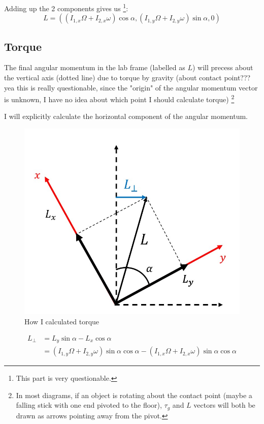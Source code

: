 \documentclass{scrartcl}
\begin{document}
Adding up the 2 components gives us \footnote{This part is very questionable.}:
\begin{equation}
    L=((I_{1,x}\Omega +I_{2,x}\omega)\cos\alpha,(I_{1,y}\Omega +I_{2,y}\omega)\sin\alpha,0)
\end{equation}

\subsection{Torque}
The final angular momentum in the lab frame (labelled as $L$) will precess about the vertical axis (dotted line) due to torque by gravity (about contact point??? yea this is really questionable, since the "origin" of the angular momentum vector is unknown, I have no idea about which point I should calculate torque) \footnote{In most diagrams, if an object is rotating about the contact point (maybe a falling stick with one end pivoted to the floor), $\tau_g$ and $L$ vectors will both be drawn as arrows pointing away from the pivot.}

I will explicitly calculate the horizontal component of the angular momentum.

\begin{figure}[h]
    \centering
    \includegraphics[scale=0.5]{diagram3.jpg}
    \caption{How I calculated torque}
    \label{3}
\end{figure}

\begin{equation}
    \begin{aligned}
        L_\perp & = L_y \sin\alpha- L_x \cos\alpha                                                                        \\
                & = (I_{1,y}\Omega +I_{2,y}\omega)\sin\alpha\cos\alpha-(I_{1,x}\Omega +I_{2,x}\omega)\sin\alpha\cos\alpha
    \end{aligned}
\end{equation}
\end{document}
